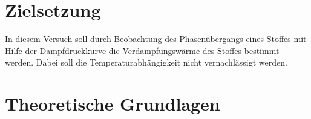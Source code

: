 \section{Zielsetzung}

In diesem Versuch soll durch Beobachtung des Phasenübergangs eines Stoffes mit Hilfe der Dampfdruckkurve die 
Verdampfungswärme des Stoffes bestimmt werden. Dabei soll die Temperaturabhängigkeit nicht vernachlässigt werden.

\section{Theoretische Grundlagen}



